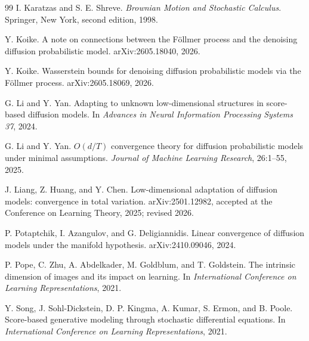 \documentclass[11pt]{article}
\theoremstyle{breakstyle}
\begin{document}
\begin{thebibliography}{99}
I. Karatzas and S. E. Shreve.
\newblock \emph{Brownian Motion and Stochastic Calculus}.
\newblock Springer, New York, second edition, 1998.

Y. Koike.
\newblock A note on connections between the F\"ollmer process and the denoising diffusion probabilistic model.
\newblock arXiv:2605.18040, 2026.

Y. Koike.
\newblock Wasserstein bounds for denoising diffusion probabilistic models via the F\"ollmer process.
\newblock arXiv:2605.18069, 2026.

G. Li and Y. Yan.
\newblock Adapting to unknown low-dimensional structures in score-based diffusion models.
\newblock In \emph{Advances in Neural Information Processing Systems 37}, 2024.

G. Li and Y. Yan.
\newblock $O(d/T)$ convergence theory for diffusion probabilistic models under minimal assumptions.
\newblock \emph{Journal of Machine Learning Research}, 26:1--55, 2025.

J. Liang, Z. Huang, and Y. Chen.
\newblock Low-dimensional adaptation of diffusion models: convergence in total variation.
\newblock arXiv:2501.12982, accepted at the Conference on Learning Theory, 2025; revised 2026.

P. Potaptchik, I. Azangulov, and G. Deligiannidis.
\newblock Linear convergence of diffusion models under the manifold hypothesis.
\newblock arXiv:2410.09046, 2024.

P. Pope, C. Zhu, A. Abdelkader, M. Goldblum, and T. Goldstein.
\newblock The intrinsic dimension of images and its impact on learning.
\newblock In \emph{International Conference on Learning Representations}, 2021.

Y. Song, J. Sohl-Dickstein, D. P. Kingma, A. Kumar, S. Ermon, and B. Poole.
\newblock Score-based generative modeling through stochastic differential equations.
\newblock In \emph{International Conference on Learning Representations}, 2021.


\end{thebibliography}
\end{document}
